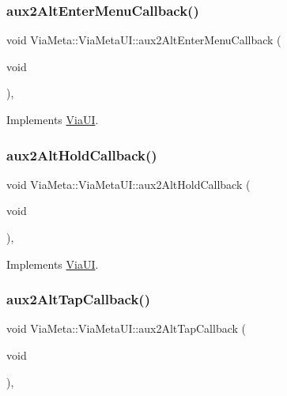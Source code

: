 \subsubsection{\texorpdfstring{aux2\+Alt\+Enter\+Menu\+Callback()}{aux2AltEnterMenuCallback()}}
{\footnotesize\ttfamily void Via\+Meta\+::\+Via\+Meta\+U\+I\+::aux2\+Alt\+Enter\+Menu\+Callback (\begin{DoxyParamCaption}\item[{void}]{ }\end{DoxyParamCaption})\hspace{0.3cm}{\ttfamily [override]}, {\ttfamily [virtual]}}



Implements \mbox{\hyperlink{class_via_u_i_a08a746b666d37ac6bc293303187fd6be}{Via\+UI}}.

\mbox{\label{class_via_meta_1_1_via_meta_u_i_a372fe7280f3107f81e7283ba7451efd6}} 
\subsubsection{\texorpdfstring{aux2\+Alt\+Hold\+Callback()}{aux2AltHoldCallback()}}
{\footnotesize\ttfamily void Via\+Meta\+::\+Via\+Meta\+U\+I\+::aux2\+Alt\+Hold\+Callback (\begin{DoxyParamCaption}\item[{void}]{ }\end{DoxyParamCaption})\hspace{0.3cm}{\ttfamily [override]}, {\ttfamily [virtual]}}



Implements \mbox{\hyperlink{class_via_u_i_ab93989ef608d1b63b854b54278006f49}{Via\+UI}}.

\mbox{\label{class_via_meta_1_1_via_meta_u_i_a5982022f5c08ce9aaa75173209d30e6c}} 
\subsubsection{\texorpdfstring{aux2\+Alt\+Tap\+Callback()}{aux2AltTapCallback()}}
{\footnotesize\ttfamily void Via\+Meta\+::\+Via\+Meta\+U\+I\+::aux2\+Alt\+Tap\+Callback (\begin{DoxyParamCaption}\item[{void}]{ }\end{DoxyParamCaption})\hspace{0.3cm}{\ttfamily [override]}, {\ttfamily [virtual]}}



